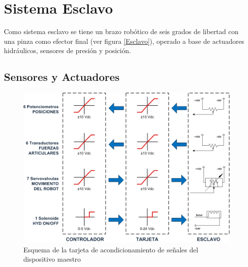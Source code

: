









\section{Sistema Esclavo}

Como sistema esclavo se tiene un brazo rob\'otico de seis grados de libertad con una pinza como efector final (ver figura \ref{Esclavo}), operado a base de actuadores hidr\'aulicos, sensores de presi\'on y posición.


\subsection{Sensores y Actuadores}

\begin{figure}
\centering
\includegraphics[scale=1]{FiguresP/EsquemaTarjetaEsclavo}
\caption{Esquema de la tarjeta de acondicionamiento de señales del dispositivo maestro}
\label{fig:EsquemaTarjetaEsclavo}
\end{figure}

